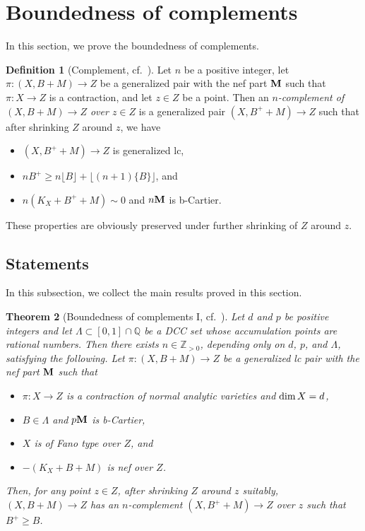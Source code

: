 \documentclass[12pt]{amsart}
\newtheorem{thm}{Theorem}[section]
\theoremstyle{definition}
\newtheorem{defn}[thm]{Definition}
\begin{document}
\section{Boundedness of complements}\label{sec--compl}

In this section, we prove the boundedness of complements. 

\begin{defn}[Complement, cf.~{\cite[Definition 5.1]{shokurov-flip}}]
Let $n$ be a positive integer, let $\pi \colon (X,B+M) \to Z$ be a generalized pair with the nef part $\boldsymbol{\rm M}$ such that $\pi \colon X \to Z$ is a contraction, and let $z \in Z$ be a point. 
Then an {\em $n$-complement of $(X,B+M) \to Z$ over $z \in Z$} is a generalized pair $(X,B^{+}+M) \to Z$ such that after shrinking $Z$ around $z$, we have
\begin{itemize}
\item
$(X,B^{+}+M) \to Z$ is generalized lc, 
\item
$nB^{+} \geq n\lfloor B \rfloor+\lfloor (n+1)\{B\}\rfloor$, and
\item
$n(K_{X}+B^{+}+M)\sim 0$ and $n \boldsymbol{\rm M}$ is b-Cartier. 
\end{itemize}
These properties are obviously preserved under further shrinking of $Z$ around $z$.
\end{defn}

\subsection{Statements}\label{subsec--state-comple}

In this subsection, we collect the main results proved in this section.  

\begin{thm}[Boundedness of complements I, cf.~{\cite[Theorem 1.2]{filipazzi-moraga}}]\label{thm--generalized-compl-main-1}
Let $d$ and $p$ be positive integers and let $\Lambda  \subset [0,1] \cap \mathbb{Q}$ be a DCC set whose accumulation points are rational numbers. 
Then there exists $n \in \mathbb{Z}_{>0}$, depending only on $d$, $p$, and $\Lambda$, satisfying the following. 
Let $\pi \colon(X,B+M) \to Z$ be a generalized lc pair with the nef part $\boldsymbol{\rm M}$ such that 
\begin{itemize}
\item
$\pi \colon X \to Z$ is a contraction of normal analytic varieties and ${\rm dim}\,X=d$, 
\item
$B \in \Lambda$ and $p \boldsymbol{\rm M}$ is b-Cartier, 
\item
$X$ is of Fano type over $Z$, and 
\item
$-(K_{X}+B+M)$ is nef over $Z$.
\end{itemize} 
Then, for any point $z \in Z$, after shrinking $Z$ around $z$ suitably, $(X,B+M)\to Z$ has an $n$-complement $(X,B^{+}+M)\to Z$ over $z$ such that $B^{+} \geq B$. 
\end{thm}
\end{document}
